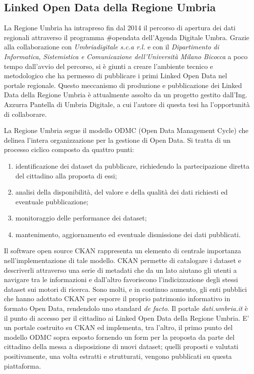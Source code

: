 \subsection{Linked Open Data della Regione Umbria}
\label{sec:intro:linked_data_production:RU}

La Regione Umbria ha intrapreso fin dal 2014 il percorso di apertura dei dati regionali attraverso il programma \#opendata dell’Agenda Digitale Umbra. Grazie alla collaborazione con \textit{Umbriadigitale s.c.a r.l.} e con il \textit{Dipartimento di Informatica, Sistemistica e Comunicazione dell’Università Milano Bicocca} a poco tempo dall’avvio del percorso, si è giunti a creare l’ambiente tecnico e metodologico che ha permesso di pubblicare i primi Linked Open Data nel portale regionale. Questo meccanismo di produzione e pubblicazione dei Linked Data della Regione Umbria è attualmente assolto da un progetto gestito dall'Ing. Azzurra Pantella di Umbria Digitale, a cui l'autore di questa tesi ha l'opportunità di collaborare.

La Regione Umbria segue il modello ODMC (Open Data Management Cycle) \cite{ODMC} che delinea l'intera organizzazione per la gestione di Open Data. Si tratta di un processo ciclico composto da quattro punti:
\begin{enumerate}
\item identificazione dei dataset da pubblicare, richiedendo la partecipazione diretta del cittadino alla proposta di essi;
\item analisi della disponibilità, del valore e della qualità dei dati richiesti ed eventuale pubblicazione;
\item monitoraggio delle performance dei dataset;
\item mantenimento, aggiornamento ed eventuale dismissione  dei dati pubblicati.
\end{enumerate}


Il software open source CKAN \cite{CKAN} rappresenta un elemento di centrale importanza nell'implementazione di tale modello. CKAN permette di catalogare i dataset e descriverli attraverso una serie di metadati che da un lato aiutano gli utenti a navigare tra le informazioni e dall’altro favoriscono l’indicizzazione degli stessi dataset sui motori di ricerca. Sono molti, e in continuo aumento, gli enti pubblici che hanno adottato CKAN per esporre il proprio patrimonio informativo in formato Open Data, rendendolo uno standard \textit{de facto}\cite{ckan_agid}.
Il portale \textit{dati.umbria.it }\cite{datiumbria} è il punto di accesso per il cittadino ai Linked Open Data della Regione Umbria. E' un portale costruito su CKAN ed implementa, tra l'altro, il primo punto del modello ODMC sopra esposto fornendo un form per la proposta da parte del cittadino della messa a disposizione di nuovi dataset; quelli proposti e valutati positivamente, una volta estratti e strutturati, vengono pubblicati su questa piattaforma.

